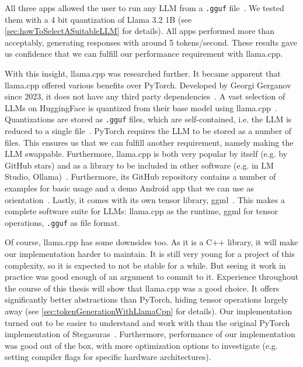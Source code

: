 All three apps allowed the user to run any \gls{LLM} from a \lstinline|.gguf| file~\cite{panchalShubham0204SmolChatAndroid2025,vali-98Vali98ChatterUI2025,ghorbaniAghorbaniPocketpalai2025}. We tested them with a 4 bit quantization of Llama 3.2 1B (see \cref{sec:howToSelectASuitableLLM} for details). All apps performed more than acceptably, generating responses with around 5 tokens/second. These results gave us confidence that we can fulfill our performance requirement with llama.cpp.

With this insight, llama.cpp was researched further. It became apparent that llama.cpp offered various benefits over PyTorch. Developed by Georgi Gerganov since 2023, it does not have any third party dependencies~\cite{gerganovGgerganovLlamacpp2024}. A vast selection of \glspl{LLM} on HuggingFace is quantized from their base model using llama.cpp~\cite{huggingfaceModelsHuggingFace2025}. Quantizations are stored as \lstinline|.gguf| files, which are self-contained, i.e. the \gls{LLM} is reduced to a single file~\cite{huggingfaceGGUF}. PyTorch requires the \gls{LLM} to be stored as a number of files. This ensures us that we can fulfill another requirement, namely making the \gls{LLM} swappable. Furthermore, llama.cpp is both very popular by itself (e.g. by GitHub stars) and as a library to be included in other software (e.g. in LM Studio, Ollama)~\cite{gerganovGgerganovLlamacpp2024}. Furthermore, its GitHub repository contains a number of examples for basic usage and a demo Android app that we can use as orientation~\cite{gerganovGgerganovLlamacpp2024}. Lastly, it comes with its own tensor library, ggml~\cite{gerganovGgerganovGgml2024}. This makes a complete software suite for \glspl{LLM}: llama.cpp as the runtime, ggml for tensor operations, \lstinline|.gguf| as file format.

Of course, llama.cpp has some downsides too. As it is a C++ library, it will make our implementation harder to maintain. It is still very young for a project of this complexity, so it is expected to not be stable for a while. But seeing it work in practice was good enough of an argument to commit to it. Experience throughout the course of this thesis will show that llama.cpp was a good choice. It offers significantly better abstractions than PyTorch, hiding tensor operations largely away (see \cref{sec:tokenGenerationWithLlamaCpp} for details). Our implementation turned out to be easier to understand and work with than the original PyTorch implementation of Stegasuras~\cite{zieglerHarvardnlpNeuralSteganography2025}. Furthermore, performance of our implementation was good out of the box, with more optimization options to investigate (e.g. setting compiler flags for specific hardware architectures).

